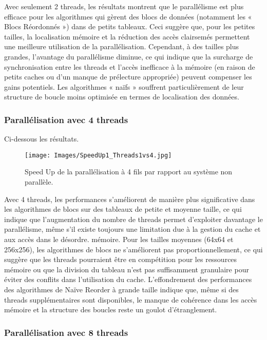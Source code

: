 \documentclass[../CSC_5RO06_TA.tex]{subfiles}
\begin{document}
Avec seulement 2 threads, les résultats montrent que le parallélisme est plus efficace pour les algorithmes qui gèrent des blocs de données (notamment les « Blocs Réordonnés ») dans de petits tableaux. Ceci suggère que, pour les petites tailles, la localisation mémoire et la réduction des accès clairsemés permettent une meilleure utilisation de la parallélisation. Cependant, à des tailles plus grandes, l'avantage du parallélisme diminue, ce qui indique que la surcharge de synchronisation entre les threads et l'accès inefficace à la mémoire (en raison de petits caches ou d'un manque de prélecture appropriée) peuvent compenser les gains potentiels. Les algorithmes « naïfs » souffrent particulièrement de leur structure de boucle moins optimisée en termes de localisation des données.


\subsubsection{Parallélisation avec 4 threads}

Ci-dessous les résultats.

\begin{figure}[H]
    \centering
    \texttt{[image: Images/SpeedUp1\_Threads1vs4.jpg]}
    \caption{Speed Up de la parallélisation à 4 fils par rapport au système non parallèle.}
    \label{fig:7}
\end{figure}

Avec 4 threads, les performances s'améliorent de manière plus significative dans les algorithmes de blocs sur des tableaux de petite et moyenne taille, ce qui indique que l'augmentation du nombre de threads permet d'exploiter davantage le parallélisme, même s'il existe toujours une limitation due à la gestion du cache et aux accès dans le désordre. mémoire. Pour les tailles moyennes (64x64 et 256x256), les algorithmes de blocs ne s'améliorent pas proportionnellement, ce qui suggère que les threads pourraient être en compétition pour les ressources mémoire ou que la division du tableau n'est pas suffisamment granulaire pour éviter des conflits dans l'utilisation du cache. L'effondrement des performances des algorithmes de Naïve Reorder à grande taille indique que, même si des threads supplémentaires sont disponibles, le manque de cohérence dans les accès mémoire et la structure des boucles reste un goulot d'étranglement.

\subsubsection{Parallélisation avec 8 threads}
\end{document}
